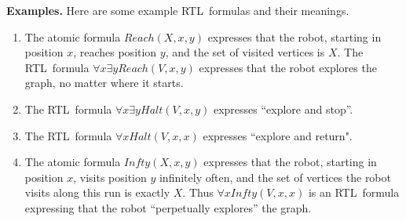 \documentclass{aamas2015}
\def\RTL{\textsf{RTL}}
\def\nat{\mathbb{N}}
\newcommand{\tup}[1]{\overline{#1}}
\newcommand{\tpl}[1]{\left<{#1}\right>}
\newcommand{\sr}[1]{\footnote{{\color{red} Note. #1}}}
\begin{document}
{\bf Examples.}
Here are some example \RTL\ formulas and their meanings.
\begin{enumerate}

\item The atomic formula $Reach(X,x,y)$ expresses that the robot, starting in position $x$, reaches position $y$, and the set of visited vertices is $X$.  The \RTL\ formula $\forall x \exists y Reach(V,x,y)$ expresses that the robot explores the graph, no matter where it starts.

\item The \RTL\ formula $\forall x \exists y Halt(V,x,y)$ expresses ``explore and stop''.

\item The \RTL\ formula $\forall x Halt(V,x,x)$ expresses ``explore and return".

\item The atomic formula $Infty(X,x,y)$ expresses that the robot, starting in position $x$, visits position $y$ infinitely often, and the set of vertices the robot visits along this run is exactly $X$. Thus $\forall x Infty(V,x,x)$ is an \RTL\ formula expressing that the robot ``perpetually explores'' the graph.

\end{enumerate}

\end{document}

